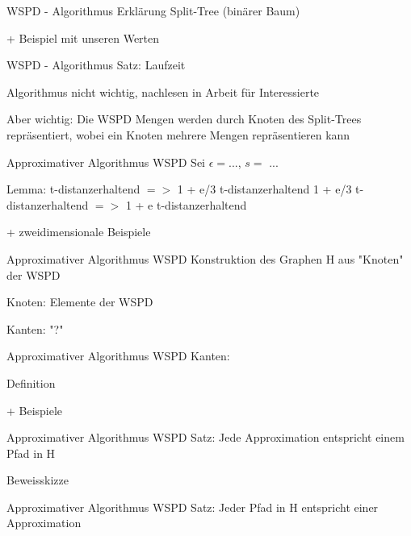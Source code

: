 \documentclass{beamer}
\begin{document}
	\begin{frame}{WSPD - Algorithmus}
		Erklärung Split-Tree (binärer Baum)
		
		+ Beispiel mit unseren Werten
	\end{frame}
	
	
	\begin{frame}{WSPD - Algorithmus}
		Satz: Laufzeit
		
		Algorithmus nicht wichtig, nachlesen in Arbeit für Interessierte
		
		Aber wichtig: Die WSPD Mengen werden durch Knoten des Split-Trees repräsentiert, wobei ein Knoten mehrere Mengen repräsentieren kann
	\end{frame}
	
	\begin{frame}{Approximativer Algorithmus WSPD}
		Sei $\epsilon = $..., $s = $ ...
		
		Lemma: 	t-distanzerhaltend $=>$ 1 + e/3 t-distanzerhaltend
				1 + e/3 t-distanzerhaltend $=>$ 1 + e t-distanzerhaltend
				
		+ zweidimensionale Beispiele
	\end{frame}
	
	\begin{frame}{Approximativer Algorithmus WSPD}
		Konstruktion des Graphen H aus "Knoten" der WSPD
		
		Knoten: Elemente der WSPD
		
		Kanten: "?"
	\end{frame}
	
	\begin{frame}{Approximativer Algorithmus WSPD}
		Kanten:
		
		Definition
		
		+ Beispiele
	\end{frame}
	
	\begin{frame}{Approximativer Algorithmus WSPD}
		Satz: Jede Approximation entspricht einem Pfad in H
		
		Beweisskizze
	\end{frame}
	
	\begin{frame}{Approximativer Algorithmus WSPD}
		Satz: Jeder Pfad in H entspricht einer Approximation
	\end{frame}
\end{document}
